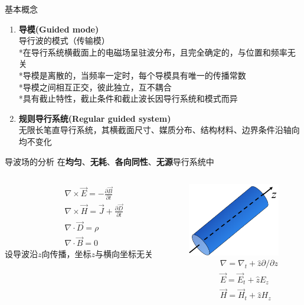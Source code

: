 \documentclass{beamer}
\newcounter{savedenum}
\newcommand*{\resume}{\setcounter{enumi}{\thesavedenum}}
\begin{document}
\begin{frame}{基本概念}
  \begin{enumerate}
    \resume
    \item \textbf{导模(Guided mode)}
    \\导行波的模式（传输模）
    \\ *在导行系统横截面上的电磁场呈驻波分布，且完全确定的，与位置和频率无关
    \\ *导模是离散的，当频率一定时，每个导模具有唯一的传播常数
    \\ *导模之间相互正交，彼此独立，互不耦合
    \\ *具有截止特性，截止条件和截止波长因导行系统和模式而异
    \item \textbf{规则导行系统(Regular guided system)}
    \\无限长笔直导行系统，其横截面尺寸、媒质分布、结构材料、边界条件沿轴向均不变化
  \end{enumerate}
\end{frame}

\begin{frame}{导波场的分析}
  在\textbf{均匀}、\textbf{无耗}、\textbf{各向同性}、\textbf{无源}导行系统中
  \begin{columns}
    \begin{column}{0.5\linewidth}
      \begin{align*}
        &\nabla\times\vec E=-\frac{\partial \vec B}{\partial t}\\
        &\nabla\times\vec H=\vec{J} +\frac{\partial \vec D}{\partial t}\\
        &\nabla\cdot\vec{D}=\rho\\
        &\nabla\cdot\vec{B}=0
      \end{align*}
      设导波沿$z$向传播，坐标$z$与横向坐标无关
    \end{column}
    \begin{column}{0.5\linewidth}
      \flushright
      \includegraphics[width=4cm]{zuobiao.png}
      \begin{align*}
        & \nabla=\nabla_{t}+\hat z \partial / \partial z\\
        & \vec E=\vec E_{t}+\hat z E_{z}\\
        & \vec H=\vec H_{t}+\hat z H_{z}
      \end{align*}
    \end{column}
  \end{columns}
\end{frame}
\end{document}
